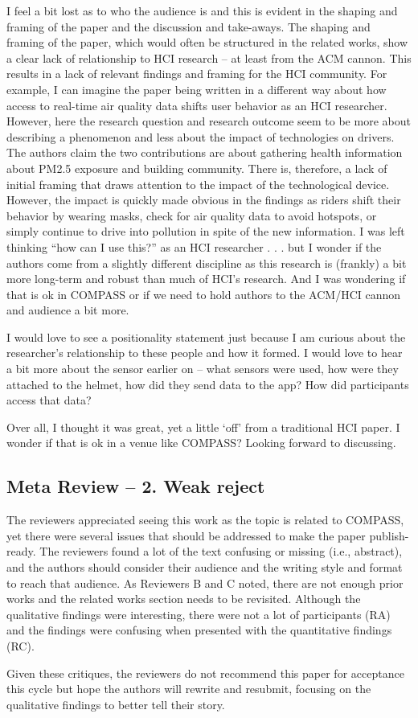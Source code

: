 I feel a bit lost as to who the audience is and this is evident in the shaping and framing of the paper and the discussion and take-aways. The shaping and framing of the paper, which would often be structured in the related works, show a clear lack of relationship to HCI research – at least from the ACM cannon. This results in a lack of relevant findings and framing for the HCI community. For example, I can imagine the paper being written in a different way about how access to real-time air quality data shifts user behavior as an HCI researcher. However, here the research question and research outcome seem to be more about describing a phenomenon and less about the impact of technologies on drivers. The authors claim the two contributions are about gathering health information about PM2.5 exposure and building community. There is, therefore, a lack of initial framing that draws attention to the impact of the technological device. However, the impact is quickly made obvious in the findings as riders shift their behavior by wearing masks, check for air quality data to avoid hotspots, or simply continue to drive into pollution in spite of the new information. I was left thinking “how can I use this?” as an HCI researcher . . . but I wonder if the authors come from a slightly different discipline as this research is (frankly) a bit more long-term and robust than much of HCI’s research. And I was wondering if that is ok in COMPASS or if we need to hold authors to the ACM/HCI cannon and audience a bit more.

I would love to see a positionality statement just because I am curious about the researcher’s relationship to these people and how it formed. I would love to hear a bit more about the sensor earlier on – what sensors were used, how were they attached to the helmet, how did they send data to the app? How did participants access that data?

Over all, I thought it was great, yet a little ‘off’ from a traditional HCI paper. I wonder if that is ok in a venue like COMPASS? Looking forward to discussing.


\clearpage
\subsection{Meta Review -- 2. Weak reject}
The reviewers appreciated seeing this work as the topic is related to COMPASS, yet there were several issues that should be addressed to make the paper publish-ready. The reviewers found a lot of the text confusing or missing (i.e., abstract), and the authors should consider their audience and the writing style and format to reach that audience. As Reviewers B and C noted, there are not enough prior works and the related works section needs to be revisited. Although the qualitative findings were interesting, there were not a lot of participants (RA) and the findings were confusing when presented with the quantitative findings (RC).

Given these critiques, the reviewers do not recommend this paper for acceptance this cycle but hope the authors will rewrite and resubmit, focusing on the qualitative findings to better tell their story.